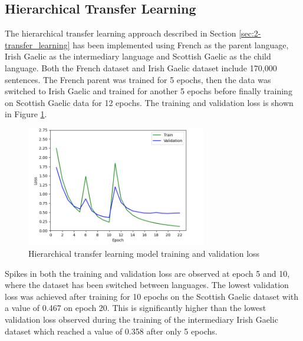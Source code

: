 

\subsection{Hierarchical Transfer Learning}
\label{sec:4-hierarchical}

The hierarchical transfer learning approach described in Section \ref{sec:2-transfer_learning} has been implemented using French as the parent language, Irish Gaelic as the intermediary language and Scottish Gaelic as the child language. Both the French dataset and Irish Gaelic dataset include 170,000 sentences. The French parent was trained for 5 epochs, then the data was switched to Irish Gaelic and trained for another 5 epochs before finally training on Scottish Gaelic data for 12 epochs. The training and validation loss is shown in Figure \ref{fig:loss_hierarchical}.

\begin{figure}[ht!]
\centering
\includegraphics[width=0.70\textwidth]{media/experiments/loss/5k/loss_hierarchical.png}
\captionsetup{justification=centering}
\caption[Hierarchical transfer learning model training and validation loss]{Hierarchical transfer learning model training and validation loss}
\label{fig:loss_hierarchical}
\end{figure}

Spikes in both the training and validation loss are observed at epoch 5 and 10, where the dataset has been switched between languages. The lowest validation loss was achieved after training for 10 epochs on the Scottish Gaelic dataset with a value of 0.467 on epoch 20. This is significantly higher than the lowest validation loss observed during the training of the intermediary Irish Gaelic dataset which reached a value of 0.358 after only 5 epochs.


